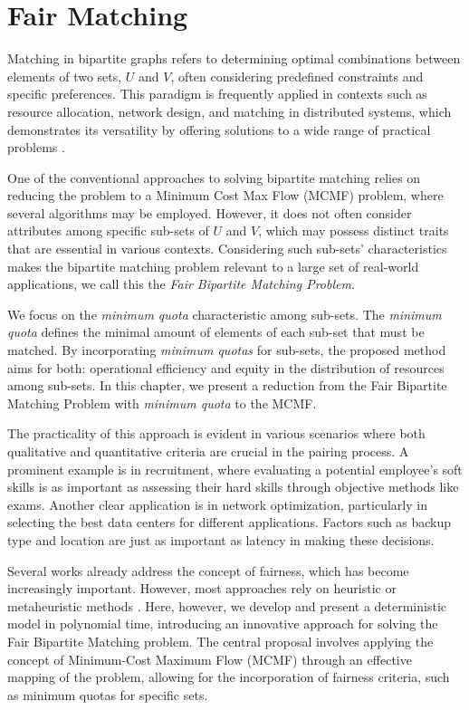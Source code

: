 \chapter{Fair Matching} \label{chap:fair_matching}
    
    Matching in bipartite graphs refers to determining optimal combinations between elements of two sets, $U$ and $V$, often considering predefined constraints and specific preferences. 
    This paradigm is frequently applied in contexts such as resource allocation, network design, and matching in distributed systems, which demonstrates its versatility by offering solutions to a wide range of practical problems \cite{karp1972reducibility}.
    
    One of the conventional approaches to solving bipartite matching relies on reducing the problem to a Minimum Cost Max Flow (MCMF) problem, where several algorithms may be employed.
    However, it does not often consider attributes among specific sub-sets of $U$ and $V$, which may possess distinct traits that are essential in various contexts.
    Considering such sub-sets' characteristics makes the bipartite matching problem relevant to a large set of real-world applications, we call this the \emph{Fair Bipartite Matching Problem}.

    We focus on the \emph{minimum quota} characteristic among sub-sets.
    The \emph{minimum quota} defines the minimal amount of elements of each sub-set that must be matched.  %
    By incorporating \emph{minimum quotas} for sub-sets, the proposed method aims for both: operational efficiency and equity in the distribution of resources among sub-sets. 
    In this chapter, we present a reduction from the Fair Bipartite Matching Problem with \emph{minimum quota} to the MCMF.

    The practicality of this approach is evident in various scenarios where both qualitative and quantitative criteria are crucial in the pairing process. 
    A prominent example is in recruitment, where evaluating a potential employee's soft skills is as important as assessing their hard skills through objective methods like exams. 
    Another clear application is in network optimization, particularly in selecting the best data centers for different applications. 
    Factors such as backup type and location are just as important as latency in making these decisions.
    
    Several works already address the concept of fairness, which has become increasingly important. However, most approaches rely on heuristic \cite{hatfield2005matching, rostami2018fairness, pappalardo2020algorithmic} or metaheuristic methods \cite{manlove2017algorithmics, yan2021metaheuristic, chapman2017matching}. Here, however, we develop and present a deterministic model in polynomial time, introducing an innovative approach for solving the Fair Bipartite Matching problem. The central proposal involves applying the concept of Minimum-Cost Maximum Flow (MCMF) through an effective mapping of the problem, allowing for the incorporation of fairness criteria, such as minimum quotas for specific sets.

